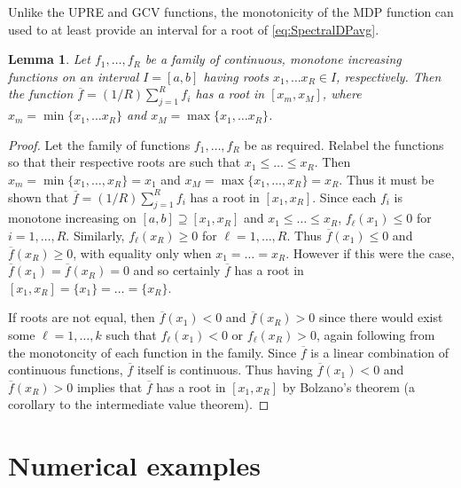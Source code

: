 \documentclass[12pt,notitlepage]{report}
\newtheorem{lemma}{Lemma}[section]
\begin{document}
Unlike the UPRE and GCV functions, the monotonicity of the MDP function can used to at least provide an interval for a root of \eqref{eq:SpectralDPavg}. 
\begin{lemma}
Let $f_1,\ldots,f_R$ be a family of continuous, monotone increasing functions on an interval $I = [a,b]$ having roots $x_1,\ldots x_R \in I$, respectively. Then the function $\overline{f} = (1/R)\sum_{j=1}^R f_i$ has a root in $[x_m,x_M]$, where $x_m = \min\{x_1,\ldots x_R\}$ and $x_M = \max\{x_1,\ldots x_R\}$.
\end{lemma}
\begin{proof}
Let the family of functions $f_1,\ldots,f_R$ be as required. Relabel the functions so that their respective roots are such that $x_1 \leq \ldots \leq x_R$. Then $x_m = \min\{x_1,\ldots,x_R\} = x_1$ and $x_M = \max\{x_1,\ldots,x_R\} = x_R$. Thus it must be shown that $\overline{f} = (1/R)\sum_{j=1}^R f_i$ has a root in $[x_1,x_R]$. Since each $f_i$ is monotone increasing on $[a,b] \supseteq [x_1,x_R]$ and $x_1 \leq \ldots \leq x_R$, $f_\ell(x_1) \leq 0$ for $i = 1,\ldots,R$. Similarly, $f_\ell(x_R) \geq 0$ for $\ell = 1,\ldots,R$. Thus $\overline{f}(x_1) \leq 0$ and $\overline{f}(x_R) \geq 0$, with equality only when $x_1 = \ldots = x_R$. However if this were the case, $\overline{f}(x_1) = \overline{f}(x_R) = 0$ and so certainly $\overline{f}$ has a root in $[x_1,x_R] = \{x_1\} = \ldots = \{x_R\}$. \par 
If roots are not equal, then $\overline{f}(x_1) < 0$ and $\overline{f}(x_R) > 0$ since there would exist some $\ell = 1,\ldots,k$ such that $f_\ell(x_1) < 0$ or $f_\ell(x_R) > 0$, again following from the monotoncity of each function in the family. Since $\overline{f}$ is a linear combination of continuous functions, $\overline{f}$ itself is continuous. Thus having $\overline{f}(x_1) < 0$ and $\overline{f}(x_R) > 0$ implies that $\overline{f}$ has a root in $[x_1,x_R]$ by Bolzano's theorem (a corollary to the intermediate value theorem).
\end{proof}

\chapter{Numerical examples} \label{sec:Numerical examples}
\end{document}
